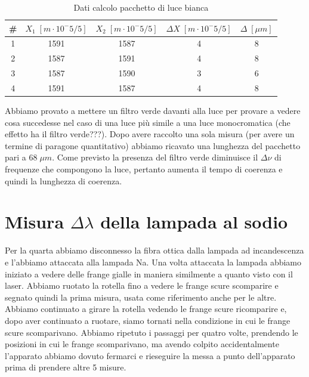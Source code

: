\documentclass{article}
\begin{document}
\begin{table}[h!]
\centering
\begin{tabular}{ | c | c | c | c | c | }
\hline
\# & $X_1 \; [m \cdot 10^-5/5]$ & $X_2 \; [m \cdot 10^-5/5]$ & $\Delta X \; [m \cdot 10^-5/5]$ & $\Delta \; [\mu m]$\\
\hline
   1 & 1591 & 1587 & 4 & 8\\
   2 & 1587 & 1591 & 4 & 8\\
   3 & 1587 & 1590 & 3 & 6\\
   4 & 1591 & 1587 & 4 & 8\\
\hline
\end{tabular}
\caption{Dati calcolo pacchetto di luce bianca}
\label{table:3}
\end{table}


Abbiamo provato a mettere un filtro verde davanti alla luce per provare a vedere cosa succedesse nel caso di una luce più simile a una luce monocromatica (che effetto ha il filtro verde???). Dopo avere raccolto una sola misura (per avere un termine di paragone quantitativo) abbiamo ricavato una lunghezza del pacchetto pari a $68 \; \mu m$. Come previsto la presenza del filtro verde diminuisce il $\Delta\nu$ di frequenze che compongono la luce, pertanto aumenta il tempo di coerenza e quindi la lunghezza di coerenza.




\section{Misura $\Delta\lambda$ della lampada al sodio}
Per la quarta abbiamo disconnesso la fibra ottica dalla lampada ad incandescenza e l'abbiamo attaccata alla lampada Na. Una volta attaccata la lampada abbiamo iniziato a vedere delle frange gialle in maniera similmente a quanto visto con il laser. Abbiamo ruotato la rotella fino a vedere le frange scure scomparire e segnato quindi la prima misura, usata come riferimento anche per le altre. Abbiamo continuato a girare la rotella vedendo le frange scure ricomparire e, dopo aver continuato a ruotare, siamo tornati nella condizione in cui le frange scure scomparivano. Abbiamo ripetuto i passaggi per quatro volte, prendendo le posizioni in cui le frange scomparivano, ma avendo colpito accidentalmente l'apparato abbiamo dovuto fermarci e rieseguire la messa a punto dell'apparato prima di prendere altre 5 misure.

\vspace{3mm}
\end{document}
